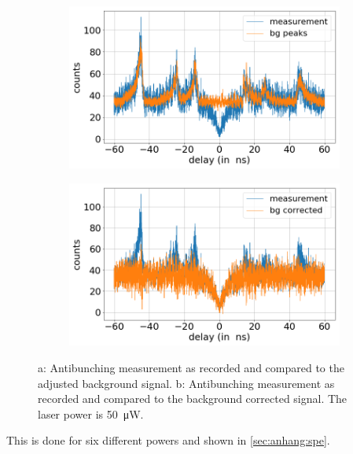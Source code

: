 \begin{figure}[!ht]
    \centering
    \begin{subfigure}{0.7\textwidth}
        \centering
        \includegraphics[width=1.0\textwidth]{img/output_t2/50.0muW_bg_peaks.png}
    \caption{}
    \label{fig_antibunch_background_comp}
    \end{subfigure}
    \begin{subfigure}{0.7\textwidth}
        \centering
        \includegraphics[width=\textwidth]{img/output_t2/50.0muW_bg_vgl.png}
        \caption{}
        \label{fig_antibunch_raw_corr_comp}
    \end{subfigure}
    \caption{a: Antibunching measurement as recorded and compared to the adjusted background signal. b: Antibunching measurement as recorded and compared to the background corrected signal. The laser power is \SI{50}{\micro W}.}
	\label{fig_antibunch_comp}
\end{figure}

This is done for six different powers and shown in \cref{sec:anhang:spe}.

